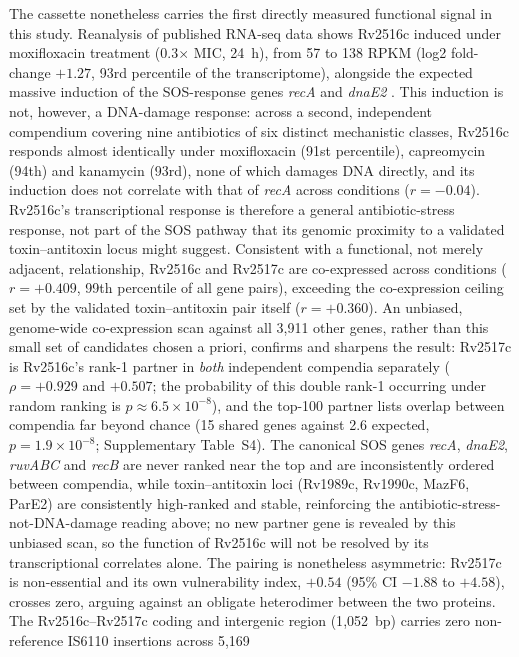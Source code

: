 \documentclass[11pt,a4paper]{article}
\begin{document}
The cassette nonetheless carries the first directly measured functional signal in this study.
Reanalysis of published RNA-seq data shows Rv2516c induced under moxifloxacin treatment (0.3$\times$
MIC, 24~h), from 57 to 138 RPKM (log2 fold-change $+1.27$, 93rd percentile of the transcriptome),
alongside the expected massive induction of the SOS-response genes \textit{recA} and
\textit{dnaE2} \citep{iacobino2021moxifloxacin}. This induction is not, however, a DNA-damage
response: across a second, independent compendium covering nine antibiotics of six distinct
mechanistic classes, Rv2516c responds almost identically under moxifloxacin (91st percentile),
capreomycin (94th) and kanamycin (93rd), none of which damages DNA directly, and its induction does
not correlate with that of \textit{recA} across conditions ($r=-0.04$). Rv2516c's transcriptional
response is therefore a general antibiotic-stress response, not part of the SOS pathway that its
genomic proximity to a validated toxin--antitoxin locus might suggest. Consistent with a functional,
not merely adjacent, relationship, Rv2516c and Rv2517c are co-expressed across conditions
($r=+0.409$, 99th percentile of all gene pairs), exceeding the co-expression ceiling set by the
validated toxin--antitoxin pair itself ($r=+0.360$). An unbiased, genome-wide co-expression scan
against all 3{,}911 other genes, rather than this small set of candidates chosen a priori, confirms
and sharpens the result: Rv2517c is Rv2516c's rank-1 partner in \emph{both} independent compendia
separately ($\rho=+0.929$ and $+0.507$; the probability of this double rank-1 occurring under
random ranking is $p\approx6.5\times10^{-8}$), and the top-100 partner lists overlap between
compendia far beyond chance (15 shared genes against 2.6 expected, $p=1.9\times10^{-8}$;
Supplementary Table~S4). The
canonical SOS genes \textit{recA}, \textit{dnaE2}, \textit{ruvABC} and \textit{recB} are never
ranked near the top and are inconsistently ordered between compendia, while toxin--antitoxin loci
(Rv1989c, Rv1990c, MazF6, ParE2) are consistently high-ranked and stable, reinforcing the
antibiotic-stress-not-DNA-damage reading above; no new partner gene is revealed by this unbiased
scan, so the function of Rv2516c will not be resolved by its transcriptional correlates alone. The
pairing is nonetheless asymmetric: Rv2517c
is non-essential and its own vulnerability index, $+0.54$ (95\% CI $-1.88$ to $+4.58$), crosses
zero, arguing against an obligate heterodimer between the two proteins. The Rv2516c--Rv2517c coding
and intergenic region (1{,}052~bp) carries zero non-reference IS6110 insertions across 5{,}169
\end{document}
